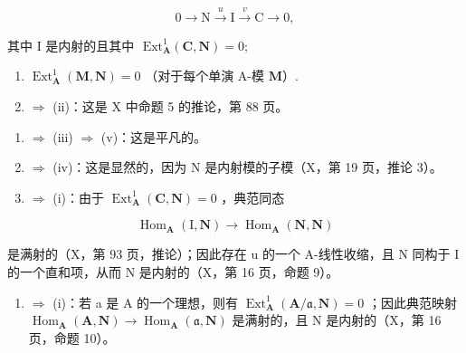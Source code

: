 \[
0 \rightarrow \mathrm{N} \xrightarrow {u} \mathrm{I} \xrightarrow {v} \mathrm{C} \rightarrow 0,
\]

\(\text{其中 I 是内射的且其中 } \text{ Ext}_{\mathbf{A}}^{1} (\mathbf{C}, \mathbf{N}) = 0;\)

\begin{enumerate}
\def\labelenumi{(\alph{enumi})}
\setcounter{enumi}{21}
\item
  \(\operatorname{Ext}_{\mathbf{A}}^{1}(\mathbf{M},\mathbf{N}) = 0\) （对于每个单演 A-模 \(\mathbf{M}\)）.
\item
  \(\Rightarrow\) (ii)：这是 X 中命题 5 的推论，第 88 页。
\end{enumerate}

\begin{enumerate}
\def\labelenumi{(\roman{enumi})}
\setcounter{enumi}{1}
\item
  \(\Rightarrow\) (iii) \(\Rightarrow\) (v)：这是平凡的。
\item
  \(\Rightarrow\) (iv)：这是显然的，因为 N 是内射模的子模（X，第 19 页，推论 3）。
\item
  \(\Rightarrow\) (i)：由于 \(\operatorname{Ext}_{\mathbf{A}}^{1}(\mathbf{C},\mathbf{N}) = 0\) ，典范同态
\end{enumerate}

\[
\operatorname{Hom} _ {\mathbf {A}} (\mathrm{I}, \mathbf {N}) \rightarrow \operatorname{Hom} _ {\mathbf {A}} (\mathbf {N}, \mathbf {N})
\]

是满射的（X，第 93 页，推论）；因此存在 u 的一个 A-线性收缩，且 N 同构于 I 的一个直和项，从而 N 是内射的（X，第 16 页，命题 9）。

\begin{enumerate}
\def\labelenumi{(\alph{enumi})}
\setcounter{enumi}{21}
\tightlist
\item
  \(\Rightarrow\) (i)：若 a 是 A 的一个理想，则有 \(\operatorname{Ext}_{\mathbf{A}}^{1}(\mathbf{A}/\mathfrak{a},\mathbf{N})=0\) ；因此典范映射 \(\operatorname{Hom}_{\mathbf{A}}(\mathbf{A},\mathbf{N})\to\operatorname{Hom}_{\mathbf{A}}(\mathfrak{a},\mathbf{N})\) 是满射的，且 N 是内射的（X，第 16 页，命题 10）。
\end{enumerate}


